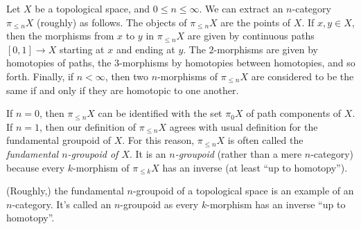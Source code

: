 \begin{example}\label{grape}
Let $X$ be a topological space, and $0 \leq n \leq \infty$. We
can extract an $n$-category $\pi_{\leq n} X$ (roughly) as follows.
The objects of $\pi_{\leq n} X$ are the points of $X$. If $x,y \in
X$, then the morphisms from $x$ to $y$ in $\pi_{\leq n} X$ are
given by continuous paths $[0,1] \rightarrow X$ starting at $x$
and ending at $y$. The $2$-morphisms are given by homotopies of
paths, the $3$-morphisms by homotopies between homotopies, and so
forth. Finally, if $n < \infty$, then two $n$-morphisms of
$\pi_{\leq n} X$ are considered to be the same if and only if they are homotopic to one another.

If $n = 0$, then $\pi_{\leq n} X$ can be identified with the set $\pi_0 X$ of path
components of $X$. If $n=1$, then our definition of $\pi_{\leq n}
X$ agrees with usual definition for the fundamental groupoid of
$X$. For this reason, $\pi_{\leq n} X$ is often called the {\it
fundamental $n$-groupoid of $X$}. It is an {\it $n$-groupoid} (rather than a mere $n$-category) 
because every $k$-morphism of $\pi_{\leq k} X$ has an inverse (at least ``up to
homotopy'').
\end{example}
\begin{shaded}
(Roughly,) the fundamental $n$-groupoid of a topological space is an example of an $n$-category. It's called an $n$-groupoid as every $k$-morphism has an inverse ``up to homotopy''.
\end{shaded}

